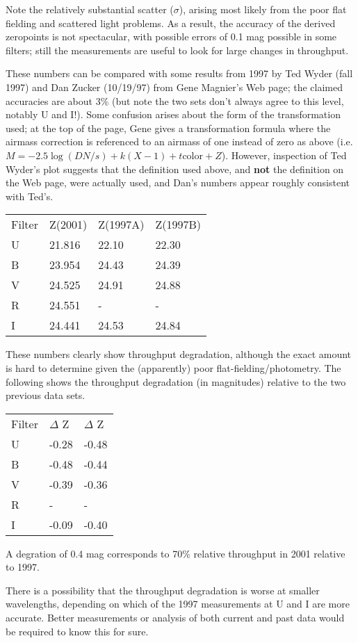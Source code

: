 \documentclass{article}
\begin{document}
Note the relatively substantial scatter ($\sigma$), arising most likely
from the poor flat fielding and scattered light problems. As a result, the
accuracy of the derived zeropoints is not spectacular, with possible errors
of 0.1 mag possible in some filters; still the measurements are useful to 
look for large changes in throughput.

These numbers can be compared with some results from 1997 by Ted Wyder
(fall 1997) and Dan Zucker (10/19/97) from Gene Magnier's Web page;
the claimed accuracies are about 3\% (but note the two sets don't always
agree to this level, notably U and I!). Some confusion arises about the
form of the transformation used; at the top of the page, Gene gives a
transformation formula where the airmass correction is referenced to
an airmass of one instead of zero as above (i.e. $M=-2.5\log (DN/s) + k
(X-1) + t \textrm{color} + Z$).  However, inspection of Ted Wyder's plot
suggests that the definition used above, and \textbf{not} the definition
on the Web page, were actually used, and Dan's numbers appear roughly
consistent with Ted's.

\begin{tabular}{llll}
Filter&Z(2001)&Z(1997A)&Z(1997B)\\
U & 21.816 & 22.10 & 22.30 \\
B & 23.954 & 24.43 & 24.39 \\
V & 24.525 & 24.91 & 24.88 \\
R & 24.551 & - & - \\
I & 24.441 & 24.53 & 24.84 \\
\end{tabular}

These numbers clearly show throughput degradation, although the exact amount
is hard to determine given the (apparently) poor flat-fielding/photometry.
The following shows the throughput degradation (in magnitudes) relative to
the two previous data sets.

\begin{tabular}{lll}
Filter&$\Delta$ Z&$\Delta$ Z\\
U&-0.28&-0.48\\
B&-0.48&-0.44\\
V&-0.39&-0.36\\
R&-&-\\
I&-0.09&-0.40\\
\end{tabular}

A degration of 0.4 mag corresponds to 70\% relative throughput in 2001 
relative to 1997.

There is a possibility that the throughput degradation is worse at smaller 
wavelengths, depending on which of the 1997 measurements at U and I are
more accurate.  Better measurements or analysis of both current and past
data would be required to know this for sure.
\end{document}
